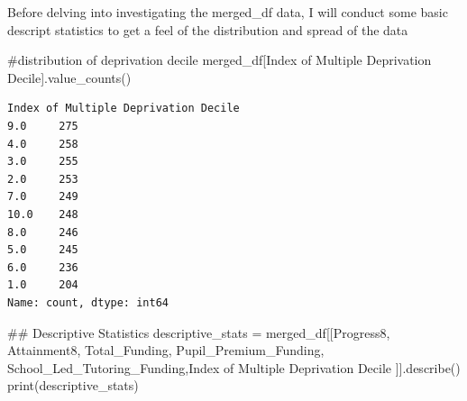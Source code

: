 \documentclass[
  letterpaper,
  DIV=11,
  numbers=noendperiod]{scrartcl}
\newenvironment{Shaded}{\begin{snugshade}}{\end{snugshade}}
\newcommand{\BuiltInTok}[1]{\textcolor[rgb]{0.00,0.23,0.31}{#1}}
\newcommand{\CommentTok}[1]{\textcolor[rgb]{0.37,0.37,0.37}{#1}}
\newcommand{\NormalTok}[1]{\textcolor[rgb]{0.00,0.23,0.31}{#1}}
\newcommand{\OperatorTok}[1]{\textcolor[rgb]{0.37,0.37,0.37}{#1}}
\newcommand{\StringTok}[1]{\textcolor[rgb]{0.13,0.47,0.30}{#1}}
\begin{document}
Before delving into investigating the merged\_df data, I will conduct
some basic descript statistics to get a feel of the distribution and
spread of the data

\begin{Shaded}
\begin{Highlighting}[]
\CommentTok{\#distribution of deprivation decile}
\NormalTok{merged\_df[}\StringTok{\textquotesingle{}Index of Multiple Deprivation Decile\textquotesingle{}}\NormalTok{].value\_counts()}
\end{Highlighting}
\end{Shaded}

\begin{verbatim}
Index of Multiple Deprivation Decile
9.0     275
4.0     258
3.0     255
2.0     253
7.0     249
10.0    248
8.0     246
5.0     245
6.0     236
1.0     204
Name: count, dtype: int64
\end{verbatim}

\begin{Shaded}
\begin{Highlighting}[]
\CommentTok{\#\# Descriptive Statistics}
\NormalTok{descriptive\_stats }\OperatorTok{=}\NormalTok{ merged\_df[[}\StringTok{\textquotesingle{}Progress8\textquotesingle{}}\NormalTok{, }\StringTok{\textquotesingle{}Attainment8\textquotesingle{}}\NormalTok{,}
                                 \StringTok{\textquotesingle{}Total\_Funding\textquotesingle{}}\NormalTok{, }\StringTok{\textquotesingle{}Pupil\_Premium\_Funding\textquotesingle{}}\NormalTok{, }\StringTok{\textquotesingle{}School\_Led\_Tutoring\_Funding\textquotesingle{}}\NormalTok{,}\StringTok{\textquotesingle{}Index of Multiple Deprivation Decile\textquotesingle{}}\NormalTok{ ]].describe()}
\BuiltInTok{print}\NormalTok{(descriptive\_stats)}
\end{Highlighting}
\end{Shaded}
\end{document}
